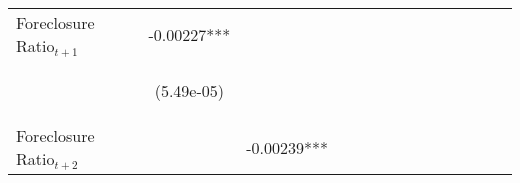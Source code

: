 \begin{table}
\begin{center}
{\begin{tabular}{lccccccccccccc}
Foreclosure Ratio$_{t+1}$   & -0.00227*** &  &  &  &  &  &  &  &  &  &  &  \\
\vspace{4pt} & \begin{footnotesize}(5.49e-05)\end{footnotesize} & \begin{footnotesize}\end{footnotesize} & \begin{footnotesize}\end{footnotesize} & \begin{footnotesize}\end{footnotesize} & \begin{footnotesize}\end{footnotesize} & \begin{footnotesize}\end{footnotesize} & \begin{footnotesize}\end{footnotesize} & \begin{footnotesize}\end{footnotesize} & \begin{footnotesize}\end{footnotesize} & \begin{footnotesize}\end{footnotesize} & \begin{footnotesize}\end{footnotesize} & \begin{footnotesize}\end{footnotesize} \\
Foreclosure Ratio$_{t+2}$   &  & -0.00239*** &  &  &  &  &  &  &  &  &  &  \\

\end{tabular}}
\end{center}
\end{table}
